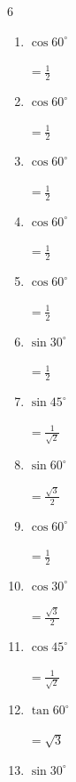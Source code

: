 \begin{multicols}{6}
\begin{enumerate}
        $\displaystyle =\frac{1}{\sqrt{2}}$

  \item $\displaystyle \cos{60^\circ}$

        $\displaystyle =\frac{1}{2}$

  \item $\displaystyle \cos{60^\circ}$

        $\displaystyle =\frac{1}{2}$

  \item $\displaystyle \cos{60^\circ}$

        $\displaystyle =\frac{1}{2}$

  \item $\displaystyle \cos{60^\circ}$

        $\displaystyle =\frac{1}{2}$

  \item $\displaystyle \cos{60^\circ}$

        $\displaystyle =\frac{1}{2}$

  \item $\displaystyle \sin{30^\circ}$

        $\displaystyle =\frac{1}{2}$

  \item $\displaystyle \sin{45^\circ}$

        $\displaystyle =\frac{1}{\sqrt{2}}$

  \item $\displaystyle \sin{60^\circ}$

        $\displaystyle =\frac{\sqrt{3}}{2}$

\columnbreak %

  \item $\displaystyle \cos{60^\circ}$

        $\displaystyle =\frac{1}{2}$

  \item $\displaystyle \cos{30^\circ}$

        $\displaystyle =\frac{\sqrt{3}}{2}$

  \item $\displaystyle \cos{45^\circ}$

        $\displaystyle =\frac{1}{\sqrt{2}}$

  \item $\displaystyle \tan{60^\circ}$

        $\displaystyle =\sqrt{3}$

  \item $\displaystyle \sin{30^\circ}$


\end{enumerate}
\end{multicols}
